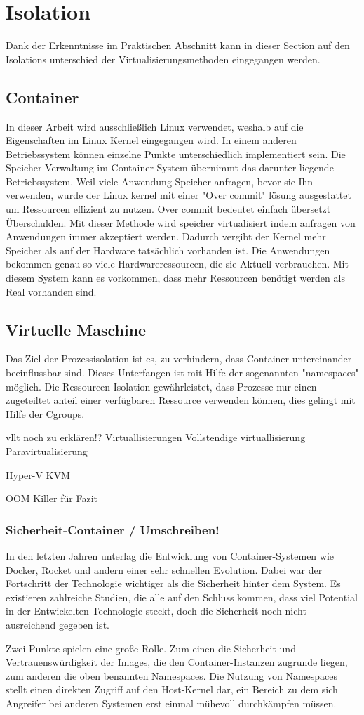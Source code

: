 \thispagestyle{empty}
\section{Isolation}
Dank der Erkenntnisse im Praktischen Abschnitt kann in dieser Section auf den Isolations unterschied der Virtualisierungsmethoden eingegangen werden.

\subsection{Container}
In dieser Arbeit wird ausschließlich Linux verwendet, weshalb auf die Eigenschaften im Linux Kernel eingegangen wird. In einem anderen Betriebssystem können einzelne Punkte unterschiedlich implementiert sein. Die Speicher Verwaltung im Container System übernimmt das darunter liegende Betriebssystem. Weil viele Anwendung Speicher anfragen, bevor sie Ihn verwenden, wurde der Linux kernel mit einer "Over commit" lösung ausgestattet um Ressourcen effizient zu nutzen. Over commit bedeutet einfach übersetzt Überschulden. Mit dieser Methode wird speicher virtualisiert indem anfragen von Anwendungen immer akzeptiert werden. Dadurch vergibt der Kernel mehr Speicher als auf der Hardware tatsächlich vorhanden ist. Die Anwendungen bekommen genau so viele Hardwareressourcen, die sie Aktuell verbrauchen. Mit diesem System kann es vorkommen, dass mehr Ressourcen benötigt werden als Real vorhanden sind. 

\subsection{Virtuelle Maschine}
Das Ziel der Prozessisolation ist es, zu verhindern, dass Container untereinander beeinflussbar sind. Dieses Unterfangen ist mit Hilfe der sogenannten "namespaces" möglich. Die Ressourcen Isolation gewährleistet, dass Prozesse nur einen zugeteiltet anteil einer verfügbaren Ressource verwenden können, dies gelingt mit Hilfe der Cgroups.


vllt noch zu erklären!?
Virtuallisierungen
Vollstendige virtuallisierung 
Paravirtualisierung

Hyper-V
KVM

OOM Killer für Fazit


\subsubsection{Sicherheit-Container / Umschreiben!}
In den letzten Jahren unterlag die Entwicklung von Container-Systemen wie Docker, Rocket und andern einer sehr schnellen Evolution. Dabei war der Fortschritt der Technologie wichtiger als die Sicherheit hinter dem System. Es existieren zahlreiche Studien, die alle auf den Schluss kommen, dass viel Potential in der Entwickelten Technologie steckt, doch die Sicherheit noch nicht ausreichend gegeben ist.

Zwei Punkte spielen eine große Rolle. Zum einen die Sicherheit und Vertrauenswürdigkeit der Images, die den Container-Instanzen zugrunde liegen, zum anderen die oben benannten Namespaces. Die Nutzung von Namespaces stellt einen direkten Zugriff auf den Host-Kernel dar, ein Bereich zu dem sich Angreifer bei anderen Systemen erst einmal mühevoll durchkämpfen müssen.